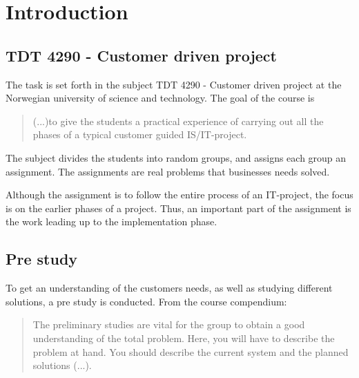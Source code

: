 \documentclass[11pt,a4paper,titlepage,oneside]{report}
\begin{document}
\tableofcontents
{}

\listoffigures
{}

\listoftables
{}

\setcounter{page}{0}


\chapter{Introduction}
\section{TDT 4290 - Customer driven project}
The task is set forth in the subject TDT 4290 - Customer driven project at the Norwegian university of science and technology. The goal of the course is 
\begin{quote}
(...)to give the students a practical experience of carrying out all the phases of a typical customer guided IS/IT-project.\cite{TDT4290 intro}
\end{quote}
The subject divides the students into random groups, and assigns each group an assignment. The assignments are real problems that businesses needs solved. 

Although the assignment is to follow the entire process of an IT-project, the focus is on the earlier phases of a project. Thus, an important part of the assignment is the work leading up to the implementation phase.

\section{Pre study}
To get an understanding of the customers needs, as well as studying different solutions, a pre study is conducted. From the course compendium:
\begin{quote}
The preliminary studies are vital for the group to obtain a good understanding of the total problem.
Here, you will have to describe the problem at hand. You should describe the current system and the
planned solutions (...).
\end{quote}
\end{document}
